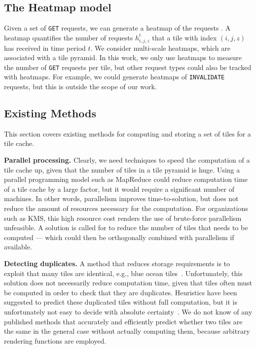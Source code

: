 \documentclass[11pt, oneside]{report}
\newcommand{\minisec}[1]{\noindent\textbf{#1.}}
\begin{document}
\subsection{The Heatmap model}
\label{sec:heatmap:model}
Given a set of \texttt{GET} requests, we can generate a heatmap of the requests \cite{fisher07}. A heatmap quantifies the number of requests $h_{i,j,z}^t$ that a tile with index $(i,j,z)$ has received in time period $t$. We consider multi-scale heatmaps, which are associated with a tile pyramid. In this work, we only use heatmaps to measure the number of \texttt{GET} requests per tile, but other request types could also be tracked with heatmaps. For example, we could generate heatmaps of \texttt{INVALIDATE} requests, but this is outside the scope of our work.

\subsection{Existing Methods}
\label{sec:existing:methods}
This section covers existing methods for computing and storing a set of tiles for a tile cache.

\minisec{Parallel processing}
Clearly, we need techniques to speed the computation of a tile cache up, given that the number of tiles in a tile pyramid is huge. Using a parallel programming model such as MapReduce \cite{dean04} could reduce computation time of a tile cache by a large factor, but it would require a significant number of machines. In other words, parallelism improves time-to-solution, but does not reduce the amount of resources necessary for the computation. For organizations such as KMS, this high resource cost renders the use of brute-force parallelism unfeasible. A solution is called for to reduce the number of tiles that needs to be computed --- which could then be orthogonally combined with parallelism if available.

\minisec{Detecting duplicates}
A method that reduces storage requirements is to exploit that many tiles are identical, e.g., blue ocean tiles~\cite{mbtile12}. Unfortunately, this solution does not necessarily reduce computation time, given that tiles often must be computed in order to check that they are duplicates. Heuristics have been suggested to predict these duplicated tiles without full computation, but it is unfortunately not easy to decide with absolute certainty~\cite{mbtile12}. We do not know of any published methods that accurately and efficiently predict whether two tiles are the same in the general case without actually computing them, because arbitrary rendering functions are employed.
\end{document}

